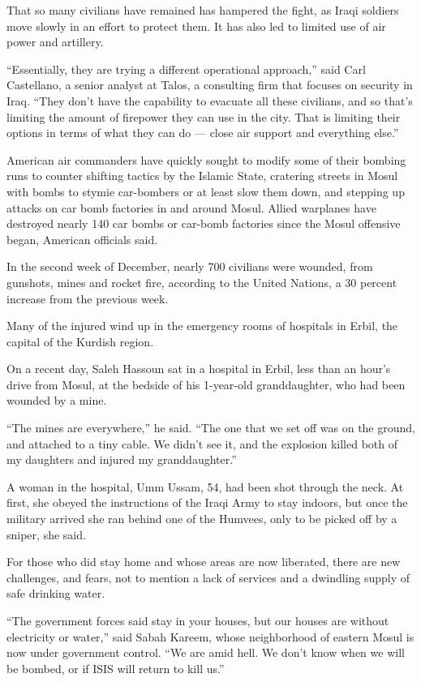 That so many civilians have remained has hampered the fight, as Iraqi
soldiers move slowly in an effort to protect them. It has also led to
limited use of air power and artillery.

``Essentially, they are trying a different operational approach,'' said
Carl Castellano, a senior analyst at Talos, a consulting firm that
focuses on security in Iraq. ``They don't have the capability to
evacuate all these civilians, and so that's limiting the amount of
firepower they can use in the city. That is limiting their options in
terms of what they can do --- close air support and everything else.''

American air commanders have quickly sought to modify some of their
bombing runs to counter shifting tactics by the Islamic State, cratering
streets in Mosul with bombs to stymie car-bombers or at least slow them
down, and stepping up attacks on car bomb factories in and around Mosul.
Allied warplanes have destroyed nearly 140 car bombs or car-bomb
factories since the Mosul offensive began, American officials said.

In the second week of December, nearly 700 civilians were wounded, from
gunshots, mines and rocket fire, according to the United Nations, a 30
percent increase from the previous week.

Many of the injured wind up in the emergency rooms of hospitals in
Erbil, the capital of the Kurdish region.

On a recent day, Saleh Hassoun sat in a hospital in Erbil, less than an
hour's drive from Mosul, at the bedside of his 1-year-old granddaughter,
who had been wounded by a mine.

``The mines are everywhere,'' he said. ``The one that we set off was on
the ground, and attached to a tiny cable. We didn't see it, and the
explosion killed both of my daughters and injured my granddaughter.''

A woman in the hospital, Umm Ussam, 54, had been shot through the neck.
At first, she obeyed the instructions of the Iraqi Army to stay indoors,
but once the military arrived she ran behind one of the Humvees, only to
be picked off by a sniper, she said.

For those who did stay home and whose areas are now liberated, there are
new challenges, and fears, not to mention a lack of services and a
dwindling supply of safe drinking water.

``The government forces said stay in your houses, but our houses are
without electricity or water,'' said Sabah Kareem, whose neighborhood of
eastern Mosul is now under government control. ``We are amid hell. We
don't know when we will be bombed, or if ISIS will return to kill us.''

